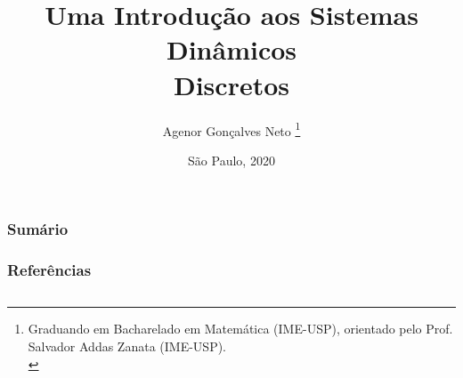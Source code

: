 \documentclass[11pt, portuguese]{beamer}
\title{Uma Introdução aos Sistemas Dinâmicos\\Discretos}\author{Agenor Gonçalves Neto \footnote{Graduando em Bacharelado em Matemática (IME-USP), orientado pelo Prof. Salvador Addas Zanata (IME-USP).\\}}
\date{São Paulo, 2020}
\begin{document}

\begin{frame}
\titlepage
\end{frame}

\begin{frame}
\vspace{5pt}
\frametitle{Sumário}
\tableofcontents
\end{frame}













\begin{frame}
\vspace{5pt}
\frametitle{Referências}
\begin{columns}
\column{\dimexpr\paperwidth-15pt}

\nocite{burns, devaney, holmgren}



\end{columns}
\end{frame}
\end{document}
